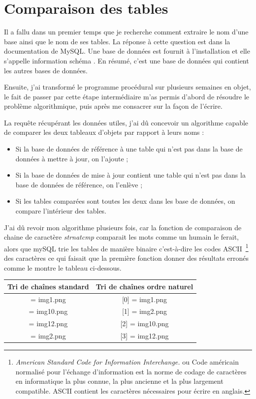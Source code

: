 \section{Comparaison des tables}


Il a fallu dans un premier temps que je recherche comment extraire le nom d'une
base ainsi que le nom de ses tables. La réponse à cette question est dans la
documentation de MySQL. Une base de données est fournit à l'installation et
elle s'appelle \og information schéma \fg{} . En résumé, c'est une base de
données qui contient les autres bases de données.

Ensuite, j'ai transformé le programme procédural sur plusieurs semaines en
objet, le fait de passer par cette étape intermédiaire m'as permis d'abord de
résoudre le problème algorithmique, puis après me consacrer sur la façon de
l'écrire.

La requête récupérant les données utiles, j'ai dû concevoir un algorithme
capable de comparer les deux tableaux d'objets par rapport à leurs noms :
\begin{itemize}
    \item Si la base de données de référence à une table qui n'est pas dans
    la base de données à mettre à jour, on l'ajoute ;
    \item Si la base de données de mise à jour contient une table qui n'est
    pas dans la base de données de référence, on l'enlève ;
    \item Si les tables comparées sont toutes les deux dans les base de
    données, on compare l'intérieur des tables.
\end{itemize}

J'ai dû revoir mon algorithme plusieurs fois, car la fonction de comparaison
de chaine de caractère \emph{strnatcmp} comparait les mots comme un humain le
ferait, alors que mySQL trie les tables de manière binaire c'est-à-dire les
codes ASCII\, \footnote{\emph{American Standard Code for Information
Interchange.} ou \og Code américain normalisé pour l'échange d'information
\fg{} est la norme de codage de caractères en informatique la plus connue, la
plus ancienne et la plus largement compatible. ASCII contient les caractères
nécessaires pour écrire en anglais.} des caractères ce qui faisait que la
première fonction donner des résultats erronés comme le montre le tableau
ci-dessous.

\begin{center}
\begin{tabular}{|c|c|}
\hline
\textbf{Tri de chaînes standard} & \textbf{Tri de chaînes ordre naturel} \\
\hline
[0] = img1.png & [0] = img1.png \\
\hline
[1] = img10.png & [1] = img2.png \\
\hline
[2] = img12.png & [2] = img10.png \\
\hline
[3] = img2.png & [3] = img12.png \\
\hline
\end{tabular}
\end{center}

